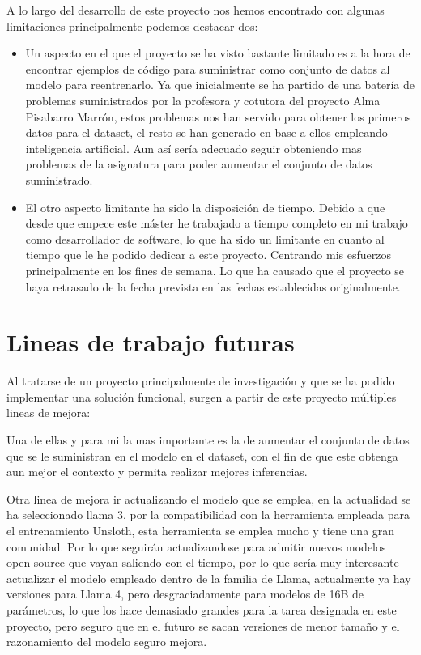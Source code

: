 A lo largo del desarrollo de este proyecto nos hemos encontrado con algunas limitaciones principalmente podemos destacar dos:

\begin{itemize}
    \item Un aspecto en el que el proyecto se ha visto bastante limitado es a la hora de encontrar ejemplos de código para suministrar como conjunto de datos al modelo para reentrenarlo. Ya que inicialmente se ha partido de una batería de problemas suministrados por la profesora y cotutora del proyecto Alma Pisabarro Marrón, estos problemas nos han servido para obtener los primeros datos para el dataset, el resto se han generado en base a ellos empleando inteligencia artificial. Aun así sería adecuado seguir obteniendo mas problemas de la asignatura para poder aumentar el conjunto de datos suministrado.

    \item El otro aspecto limitante ha sido la disposición de tiempo. Debido a que desde que empece este máster he trabajado a tiempo completo en mi trabajo como desarrollador de software, lo que ha sido un limitante en cuanto al tiempo que le he podido dedicar a este proyecto. Centrando mis esfuerzos principalmente en los fines de semana. Lo que ha causado que el proyecto se haya retrasado de la fecha prevista  en las fechas establecidas originalmente.
\end{itemize}

\section{Lineas de trabajo futuras}
\label{ap:lineas de trabajo futuras}
Al tratarse de un proyecto principalmente de investigación y que se ha podido implementar una solución funcional, surgen a partir de este proyecto múltiples lineas de mejora:

Una de ellas y para mi la mas importante es la de aumentar el conjunto de datos que se le suministran en el modelo en el dataset, con el fin de que este obtenga aun mejor el contexto y permita realizar mejores inferencias.

 Otra linea de mejora ir actualizando el modelo que se emplea, en la actualidad se ha seleccionado llama 3, por la compatibilidad con la herramienta empleada para el entrenamiento Unsloth, esta herramienta se emplea mucho y tiene una gran comunidad. Por lo que seguirán actualizandose para admitir nuevos modelos open-source que vayan saliendo con el tiempo, por lo que sería muy interesante actualizar el modelo empleado dentro de la familia de Llama, actualmente ya hay versiones para Llama 4, pero desgraciadamente para modelos de 16B de parámetros, lo que los hace demasiado grandes para la tarea designada en este proyecto, pero seguro que en el futuro se sacan versiones de menor tamaño y el razonamiento del modelo seguro mejora.

